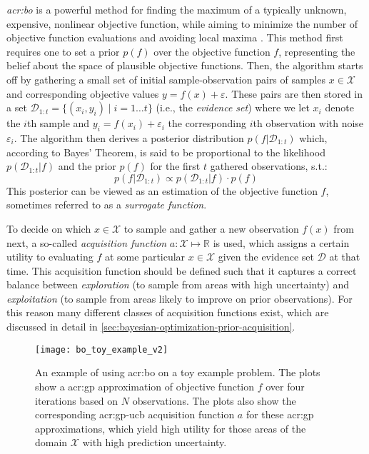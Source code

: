 \textit{\acrfull{acr:bo}} is a powerful method for finding the maximum of a typically unknown, expensive, nonlinear objective function, while aiming to minimize the number of objective function evaluations and avoiding local maxima \cite{Brochu2010}.
This method first requires one to set a prior $p(f)$ over the objective function $f$, representing the belief about the space of plausible objective functions.
Then, the algorithm starts off by gathering a small set of initial sample-observation pairs of samples $x \in \mathcal{X}$ and corresponding objective values $y = f(x) + \varepsilon$.
These pairs are then stored in a set $\mathcal{D}_{1:t} = \{(x_i, y_i) \mid i = 1 \ldots t\}$ (i.e., the \textit{evidence set}) where we let $x_i$ denote the $i$th sample and $y_i = f(x_i) + \varepsilon_i$ the corresponding $i$th observation with noise $\varepsilon_i$.
The algorithm then derives a posterior distribution $p(f \vert \mathcal{D}_{1:t})$ which, according to Bayes' Theorem, is said to be proportional to the likelihood $p(\mathcal{D}_{1:t} \vert f)$ and the prior $p(f)$ for the first $t$ gathered observations, s.t.:
\begin{equation}
	p(f \vert \mathcal{D}_{1:t}) \propto p(\mathcal{D}_{1:t} \vert f) \cdot p(f)
\end{equation}
This posterior can be viewed as an estimation of the objective function $f$, sometimes referred to as a \textit{surrogate function}.

To decide on which $x \in \mathcal{X}$ to sample and gather a new observation $f(x)$ from next, a so-called \textit{acquisition function} $a: \mathcal{X} \mapsto \mathbb{R}$ is used, which assigns a certain utility to evaluating $f$ at some particular $x \in \mathcal{X}$ given the evidence set $\mathcal{D}$ at that time.
This acquisition function should be defined such that it captures a correct balance between \textit{exploration} (to sample from areas with high uncertainty) and \textit{exploitation} (to sample from areas likely to improve on prior observations). For this reason many different classes of acquisition functions exist, which are discussed in detail in \autoref{sec:bayesian-optimization-prior-acquisition}.

\begin{figure}
	\centering
	\texttt{[image: bo\_toy\_example\_v2]}
	\caption{An example of using \acrlong{acr:bo} on a toy example problem. The plots show a \acrshort{acr:gp} approximation of objective function $f$ over four iterations based on $N$ observations. The plots also show the corresponding \acrshort{acr:gp-ucb} acquisition function $a$ for these \acrshort{acr:gp} approximations, which yield high utility for those areas of the domain $\mathcal{X}$ with high prediction uncertainty.}
	\label{fig:bo-toy-example}
\end{figure}

